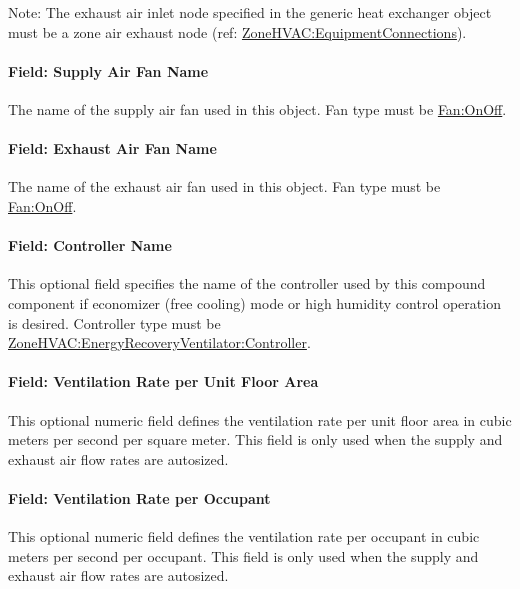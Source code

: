 Note: The exhaust air inlet node specified in the generic heat exchanger object must be a zone air exhaust node (ref: \hyperref[zonehvacequipmentconnections]{ZoneHVAC:EquipmentConnections}).

\paragraph{Field: Supply Air Fan Name}\label{field-supply-air-fan-name-7}

The name of the supply air fan used in this object. Fan type must be \hyperref[fanonoff]{Fan:OnOff}.

\paragraph{Field: Exhaust Air Fan Name}\label{field-exhaust-air-fan-name}

The name of the exhaust air fan used in this object. Fan type must be \hyperref[fanonoff]{Fan:OnOff}.

\paragraph{Field: Controller Name}\label{field-controller-name}

This optional field specifies the name of the controller used by this compound component if economizer (free cooling) mode or high humidity control operation is desired. Controller type must be \hyperref[zonehvacenergyrecoveryventilatorcontroller]{ZoneHVAC:EnergyRecoveryVentilator:Controller}.

\paragraph{Field: Ventilation Rate per Unit Floor Area}\label{field-ventilation-rate-per-unit-floor-area}

This optional numeric field defines the ventilation rate per unit floor area in cubic meters per second per square meter. This field is only used when the supply and exhaust air flow rates are autosized.

\paragraph{Field: Ventilation Rate per Occupant}\label{field-ventilation-rate-per-occupant}

This optional numeric field defines the ventilation rate per occupant in cubic meters per second per occupant. This field is only used when the supply and exhaust air flow rates are autosized.

